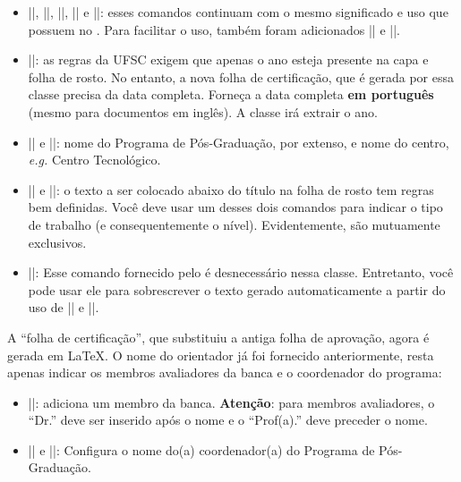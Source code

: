 \documentclass[embeddedlogo]{../ufsc-thesis-rn46-2019}
\begin{document}
\begin{itemize}
  \item \mt|\titulode|, \mt|\autor|, \mt|\instituicao|, \mt|\orientador| e
      \mt|\coorientador|: esses comandos continuam com o mesmo significado e
        uso que possuem no \abnTeX. Para facilitar o uso, também foram
        adicionados \mt|\orientadora| e \mt|\coorientadora|.
  \item \mt|\data|: as regras da UFSC exigem que apenas o ano esteja presente
      na capa e folha de rosto. No entanto, a nova folha de certificação, que é
        gerada por essa classe precisa da data completa. Forneça a data
        completa \textbf{em português} (mesmo para documentos em inglês). A
        classe irá extrair o ano.
  \item \mt|\programa| e \mt|\centro|: nome do Programa de Pós-Graduação, por
      extenso, e nome do centro, \emph{e.g.} Centro Tecnológico.
  \item \mt|\tese| e \mt|\dissertacao|: o texto a ser colocado abaixo do título
      na folha de rosto tem regras bem definidas. Você deve usar um desses dois
        comandos para indicar o tipo de trabalho (e consequentemente o nível).
        Evidentemente, são mutuamente exclusivos.
  \item \mt|\preambulo|: Esse comando fornecido pelo \abnTeX{} é desnecessário
      nessa classe. Entretanto, você pode usar ele para sobrescrever o texto
        gerado automaticamente a partir do uso de \mt|\tese| e \mt|\titulode|.
\end{itemize}

A ``folha de certificação'', que substituiu a antiga folha de aprovação, agora
é gerada em \LaTeX. O nome do orientador já foi fornecido anteriormente, resta
apenas indicar os membros avaliadores da banca e o coordenador do programa:
\begin{itemize}
  \item \mt||: adiciona um membro da banca.
      \textbf{Atenção}: para membros avaliadores, o ``Dr.'' deve ser inserido
        após o nome e o ``Prof(a).'' deve preceder o nome.
  \item \mt|\coordenador| e \mt|\coordenadora|: Configura o nome do(a)
      coordenador(a) do Programa de Pós-Graduação.
\end{itemize}
\end{document}
